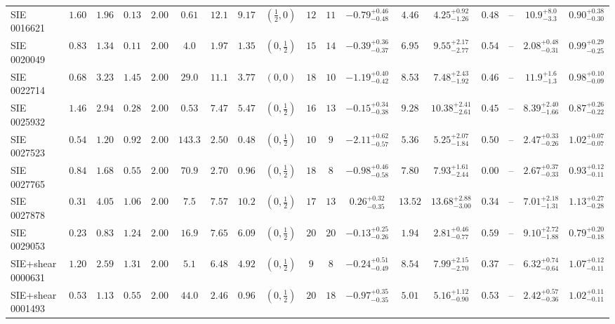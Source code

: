 \begin{longtable}{@{}lccccccccccccccccc@{}}
SIE 0016621 & $1.60$ & $1.96$ & $0.13$ & $2.00$ & $0.61$ & $12.1$ & $9.17$ & $(\frac12,0)$ & $12$ & $11$ & $-0.79^{+0.46}_{-0.48}$ & $4.46$ & $4.25^{+0.92}_{-1.26}$ & $0.48$ & -- & $10.9^{+8.0}_{-3.3}$ & $0.90^{+0.38}_{-0.30}$\\
SIE 0020049 & $0.83$ & $1.34$ & $0.11$ & $2.00$ & $4.0$ & $1.97$ & $1.35$ & $(0,\frac12)$ & $15$ & $14$ & $-0.39^{+0.36}_{-0.37}$ & $6.95$ & $9.55^{+2.17}_{-2.77}$ & $0.54$ & -- & $2.08^{+0.48}_{-0.31}$ & $0.99^{+0.29}_{-0.25}$\\
SIE 0022714 & $0.68$ & $3.23$ & $1.45$ & $2.00$ & $29.0$ & $11.1$ & $3.77$ & $(0,0)$ & $18$ & $10$ & $-1.19^{+0.40}_{-0.42}$ & $8.53$ & $7.48^{+2.43}_{-1.92}$ & $0.46$ & -- & $11.9^{+1.6}_{-1.3}$ & $0.98^{+0.10}_{-0.09}$\\
SIE 0025932 & $1.46$ & $2.94$ & $0.28$ & $2.00$ & $0.53$ & $7.47$ & $5.47$ & $(0,\frac12)$ & $16$ & $13$ & $-0.15^{+0.34}_{-0.38}$ & $9.28$ & $10.38^{+2.41}_{-2.61}$ & $0.45$ & -- & $8.39^{+2.40}_{-1.66}$ & $0.87^{+0.26}_{-0.22}$\\
SIE 0027523 & $0.54$ & $1.20$ & $0.92$ & $2.00$ & $143.3$ & $2.50$ & $0.48$ & $(0,\frac12)$ & $10$ & $9$ & $-2.11^{+0.62}_{-0.57}$ & $5.36$ & $5.25^{+2.07}_{-1.84}$ & $0.50$ & -- & $2.47^{+0.33}_{-0.26}$ & $1.02^{+0.07}_{-0.07}$\\
SIE 0027765 & $0.84$ & $1.68$ & $0.55$ & $2.00$ & $70.9$ & $2.70$ & $0.96$ & $(0,\frac12)$ & $18$ & $8$ & $-0.98^{+0.46}_{-0.58}$ & $7.80$ & $7.93^{+1.61}_{-2.44}$ & $0.00$ & -- & $2.67^{+0.37}_{-0.33}$ & $0.93^{+0.12}_{-0.11}$\\
SIE 0027878 & $0.31$ & $4.05$ & $1.06$ & $2.00$ & $7.5$ & $7.57$ & $10.2$ & $(0,\frac12)$ & $17$ & $13$ & $0.26^{+0.32}_{-0.35}$ & $13.52$ & $13.68^{+2.88}_{-3.00}$ & $0.34$ & -- & $7.01^{+2.18}_{-1.31}$ & $1.13^{+0.27}_{-0.28}$\\
SIE 0029053 & $0.23$ & $0.83$ & $1.24$ & $2.00$ & $16.9$ & $7.65$ & $6.09$ & $(0,\frac12)$ & $20$ & $20$ & $-0.13^{+0.25}_{-0.26}$ & $1.94$ & $2.81^{+0.46}_{-0.77}$ & $0.59$ & -- & $9.10^{+2.72}_{-1.88}$ & $0.79^{+0.20}_{-0.18}$\\
SIE+shear 0000631 & $1.20$ & $2.59$ & $1.31$ & $2.00$ & $5.1$ & $6.48$ & $4.92$ & $(0,\frac12)$ & $9$ & $8$ & $-0.24^{+0.51}_{-0.49}$ & $8.54$ & $7.99^{+2.15}_{-2.70}$ & $0.37$ & -- & $6.32^{+0.74}_{-0.64}$ & $1.07^{+0.12}_{-0.11}$\\
SIE+shear 0001493 & $0.53$ & $1.13$ & $0.55$ & $2.00$ & $44.0$ & $2.46$ & $0.96$ & $(0,\frac12)$ & $20$ & $18$ & $-0.97^{+0.35}_{-0.35}$ & $5.01$ & $5.16^{+1.12}_{-0.90}$ & $0.53$ & -- & $2.42^{+0.57}_{-0.36}$ & $1.02^{+0.11}_{-0.11}$\\

\end{longtable}
